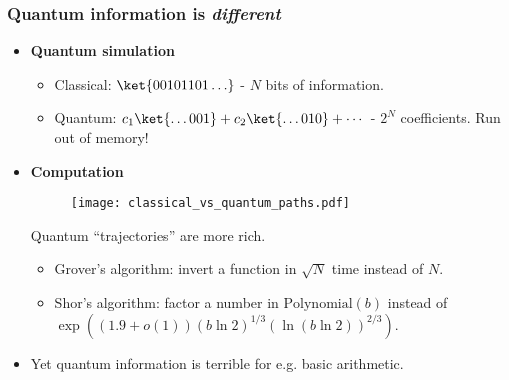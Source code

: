 \begin{frame}
\frametitle{Quantum information is \emph{different}}
\begin{itemize}
  \item \textbf{Quantum simulation}
  \begin{itemize}
    \item Classical: $\ket{00101101\ldots}$ - $N$ bits of information.
    \item Quantum: $c_1 \ket{\ldots 001} + c_2 \ket{\ldots 010} + \cdots$ - $2^N$ coefficients.
  Run out of memory!
  \end{itemize}
  \pause
  \item \textbf{Computation}
  \begin{figure}
  \texttt{[image: classical\_vs\_quantum\_paths.pdf]}
  \end{figure}
  Quantum ``trajectories'' are more rich.
  \begin{itemize}
    \item Grover's algorithm: invert a function in $\sqrt{N}$ time instead of $N$.
    \item Shor's algorithm: factor a number in $\text{Polynomial}(b)$ instead of $\exp\left( (1.9 + o(1))(b \ln 2)^{1/3} ( \ln(b \ln 2))^{2/3} \right)$.
  \end{itemize}
  \pause
  \item Yet quantum information is terrible for e.g. basic arithmetic.
\end{itemize}
\end{frame}
